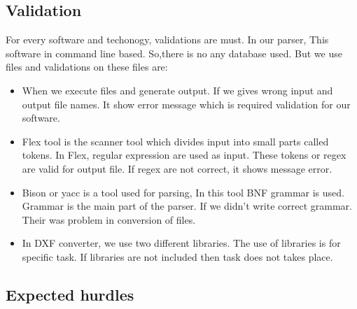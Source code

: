 \subsection{ Validation} 
For every software and techonogy, validations are must. In our parser, This software in command line based. So,there is no any database used. But we use files and validations on these files are:
\begin{itemize} 
\item When we execute files and generate output. If we gives wrong input and output file names. It show error message which is required validation for our software. 
\item Flex tool is the scanner tool which divides input into small parts called tokens. In Flex, regular expression are used as input. These tokens or regex are valid for output file. If regex are not correct, it shows message error.
\item Bison or yacc is a tool used for parsing, In this tool BNF grammar is used. Grammar is the main part of the parser. If we didn't write correct grammar. Their was problem in conversion of files.
\item In DXF converter, we use two different libraries. The use of libraries is for specific task. If libraries are not included then task does not takes place.
\end{itemize} 

\subsection{Expected hurdles}

